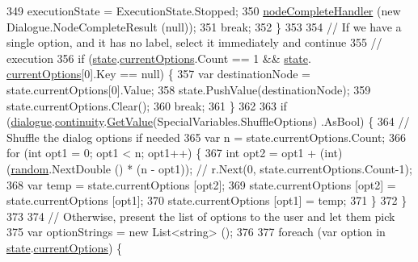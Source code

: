 \begin{DoxyCode}
349                     executionState = ExecutionState.Stopped;
350                     \hyperlink{a00136_a5129c63e67e2d4e2780d86b8351320a2}{nodeCompleteHandler} (\textcolor{keyword}{new} Dialogue.NodeCompleteResult (null));
351                     \textcolor{keywordflow}{break};
352                 \}
353 
354                 \textcolor{comment}{// If we have a single option, and it has no label, select it immediately and continue}
355                 \textcolor{comment}{// execution}
356                 \textcolor{keywordflow}{if} (\hyperlink{a00136_a70f2ce6201cdd2430ceaa764ac614ca0}{state}.\hyperlink{a00139_ab816dfea32ecda23282700f01454e0a9}{currentOptions}.Count == 1 && \hyperlink{a00136_a70f2ce6201cdd2430ceaa764ac614ca0}{state}.
      \hyperlink{a00139_ab816dfea32ecda23282700f01454e0a9}{currentOptions}[0].Key == null) \{
357                     var destinationNode = state.currentOptions[0].Value;
358                     state.PushValue(destinationNode);
359                     state.currentOptions.Clear();
360                     \textcolor{keywordflow}{break};
361                 \}
362 
363                 \textcolor{keywordflow}{if} (\hyperlink{a00136_ac506426c503da5f033247c29e11c5e82}{dialogue}.\hyperlink{a00070_ae94eaa4b03b432422f5d205fabe37ff5}{continuity}.\hyperlink{a00164_accab1fc5c8fc353dbfc53ca0f4029576}{GetValue}(SpecialVariables.ShuffleOptions)
      .AsBool) \{
364                     \textcolor{comment}{// Shuffle the dialog options if needed}
365                     var n = state.currentOptions.Count;
366                     \textcolor{keywordflow}{for} (\textcolor{keywordtype}{int} opt1 = 0; opt1 < n; opt1++) \{
367                         \textcolor{keywordtype}{int} opt2 = opt1 + (int)(\hyperlink{a00136_a408485a00c7cc558428c86ed9dd04fca}{random}.NextDouble () * (n - opt1)); \textcolor{comment}{// r.Next(0,
       state.currentOptions.Count-1);}
368                         var temp = state.currentOptions [opt2];
369                         state.currentOptions [opt2] = state.currentOptions [opt1];
370                         state.currentOptions [opt1] = temp;
371                     \}
372                 \}
373 
374                 \textcolor{comment}{// Otherwise, present the list of options to the user and let them pick}
375                 var optionStrings = \textcolor{keyword}{new} List<string> ();
376 
377                 \textcolor{keywordflow}{foreach} (var option \textcolor{keywordflow}{in} \hyperlink{a00136_a70f2ce6201cdd2430ceaa764ac614ca0}{state}.\hyperlink{a00139_ab816dfea32ecda23282700f01454e0a9}{currentOptions}) \{

\end{DoxyCode}
